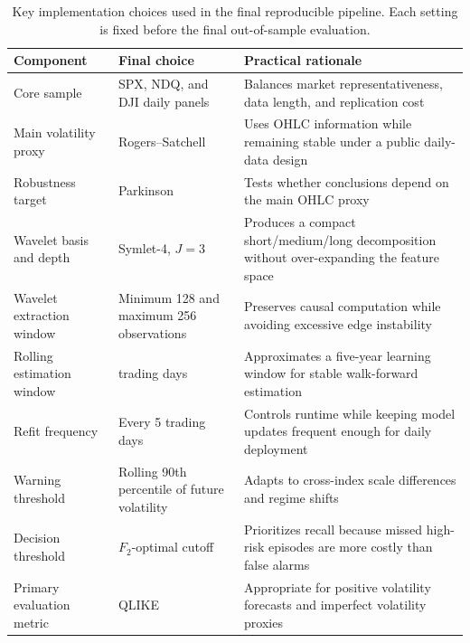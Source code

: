 \begin{table}[H]
\caption{Key implementation choices used in the final reproducible pipeline. Each setting is fixed before the final out-of-sample evaluation.}
\label{tab:implementation_choices}
\centering
\small
\setlength{\tabcolsep}{4pt}
\renewcommand{\arraystretch}{1.12}
\begin{tabular}{>{\raggedright\arraybackslash}p{}>{\raggedright\arraybackslash}p{}>{\raggedright\arraybackslash}p{}}
\toprule
Component & Final choice & Practical rationale \\
\midrule
Core sample & SPX, NDQ, and DJI daily panels & Balances market representativeness, data length, and replication cost \\
Main volatility proxy & Rogers--Satchell & Uses OHLC information while remaining stable under a public daily-data design \\
Robustness target & Parkinson & Tests whether conclusions depend on the main OHLC proxy \\
Wavelet basis and depth & Symlet-4, \(J=3\) & Produces a compact short/medium/long decomposition without over-expanding the feature space \\
Wavelet extraction window & Minimum 128 and maximum 256 observations & Preserves causal computation while avoiding excessive edge instability \\
Rolling estimation window & 1260 trading days & Approximates a five-year learning window for stable walk-forward estimation \\
Refit frequency & Every 5 trading days & Controls runtime while keeping model updates frequent enough for daily deployment \\
Warning threshold & Rolling 90th percentile of future volatility & Adapts to cross-index scale differences and regime shifts \\
Decision threshold & \(F_2\)-optimal cutoff & Prioritizes recall because missed high-risk episodes are more costly than false alarms \\
Primary evaluation metric & QLIKE & Appropriate for positive volatility forecasts and imperfect volatility proxies \\
\bottomrule
\end{tabular}
\end{table}
